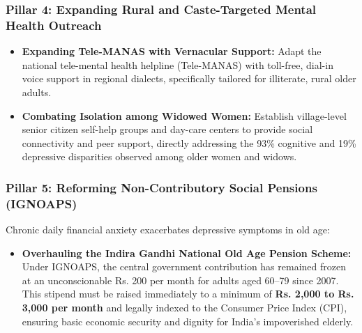 \subsubsection{Pillar 4: Expanding Rural and Caste-Targeted Mental Health Outreach}
\begin{itemize}
    \item \textbf{Expanding Tele-MANAS with Vernacular Support:} Adapt the national tele-mental health helpline (Tele-MANAS) with toll-free, dial-in voice support in regional dialects, specifically tailored for illiterate, rural older adults.
    \item \textbf{Combating Isolation among Widowed Women:} Establish village-level senior citizen self-help groups and day-care centers to provide social connectivity and peer support, directly addressing the 93\% cognitive and 19\% depressive disparities observed among older women and widows.
\end{itemize}

\subsubsection{Pillar 5: Reforming Non-Contributory Social Pensions (IGNOAPS)}
Chronic daily financial anxiety exacerbates depressive symptoms in old age:
\begin{itemize}
    \item \textbf{Overhauling the Indira Gandhi National Old Age Pension Scheme:} Under IGNOAPS, the central government contribution has remained frozen at an unconscionable Rs. 200 per month for adults aged 60--79 since 2007. This stipend must be raised immediately to a minimum of \textbf{Rs. 2,000 to Rs. 3,000 per month} and legally indexed to the Consumer Price Index (CPI), ensuring basic economic security and dignity for India's impoverished elderly.
\end{itemize}
